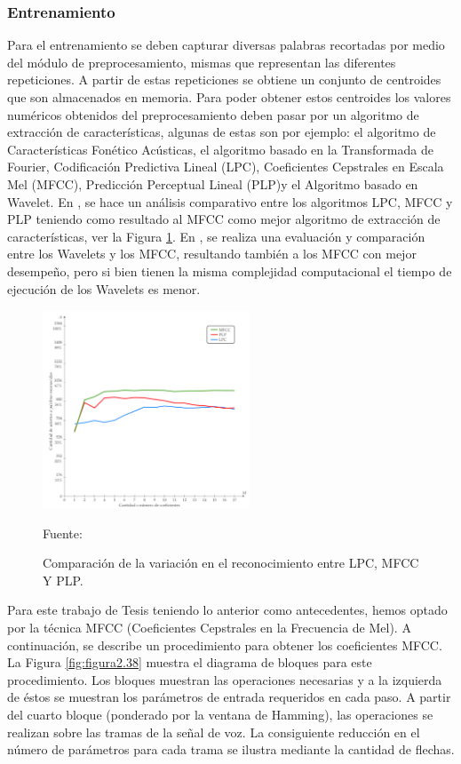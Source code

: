 \subsubsection{Entrenamiento}
Para el entrenamiento se deben capturar diversas palabras recortadas por medio del módulo de preprocesamiento, mismas que representan las diferentes repeticiones. A partir de estas repeticiones se obtiene un conjunto de centroides que son almacenados en memoria. Para poder obtener estos centroides los valores numéricos obtenidos del preprocesamiento deben pasar por un algoritmo de extracción de características, algunas de estas son por ejemplo: el algoritmo de Características Fonético Acústicas, el algoritmo basado en la Transformada de Fourier, Codificación Predictiva Lineal (LPC), Coeficientes Cepstrales en Escala Mel (MFCC), Predicción Perceptual Lineal (PLP)y el Algoritmo basado en Wavelet.
\vskip 0.5cm
En \citep{unam}, se hace un análisis comparativo entre los algoritmos LPC, MFCC y PLP teniendo como resultado al MFCC como mejor algoritmo de extracción de características, ver la Figura \ref{fig:figura2.36}. En \citep{orlando}, se realiza una evaluación y comparación entre los Wavelets y los MFCC, resultando también a los MFCC con mejor desempeño, pero si bien tienen la misma complejidad computacional el tiempo de ejecución de los Wavelets es menor.
\newpage
\begin{figure}[ht]
\begin{center}
\includegraphics[width=0.55\textwidth]{Imagenes/Cap2/image037}
\end{center}
\begin{center}
\vskip -0.5cm
\caption{\small{Comparación de la variación en el reconocimiento entre LPC, MFCC Y PLP.}}
\label{fig:figura2.36}
{\small{Fuente: \cite{unam}}}
\end{center}
\end{figure}
\vskip -0.5cm
Para este trabajo de Tesis teniendo lo anterior como antecedentes, hemos optado por la técnica MFCC (Coeficientes Cepstrales en la Frecuencia de Mel). A continuación, se describe un procedimiento para obtener los coeficientes MFCC. 
\vskip 0.5cm
La Figura \ref{fig:figura2.38} muestra el diagrama de bloques para este procedimiento. Los bloques muestran las operaciones necesarias y a la izquierda de éstos se muestran los parámetros de entrada requeridos en cada paso. A partir del cuarto bloque (ponderado por la ventana de Hamming), las operaciones se realizan sobre las tramas de la señal de voz. La consiguiente reducción en el número de parámetros para cada trama se ilustra mediante la cantidad de flechas. 
\newpage

